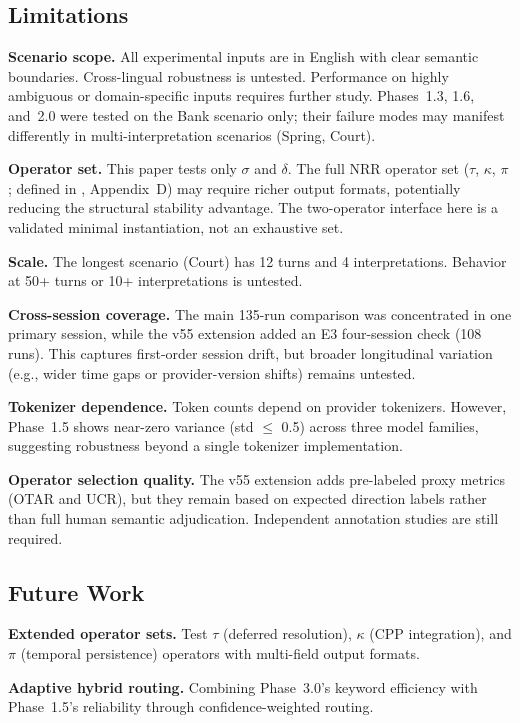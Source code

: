 \documentclass[11pt,a4paper]{article}
\begin{document}
\subsection{Limitations}

\textbf{Scenario scope.} All experimental inputs are in English with clear semantic
boundaries. Cross-lingual robustness is untested. Performance on highly
ambiguous or domain-specific inputs requires further study.
Phases~1.3, 1.6, and~2.0 were tested on the Bank scenario only; their failure
modes may manifest differently in multi-interpretation scenarios (Spring, Court).

\textbf{Operator set.} This paper tests only $\sigma$ and $\delta$. The full
NRR operator set ($\tau$, $\kappa$, $\pi$; defined in \cite{saito2026phi}, Appendix~D) may require richer output formats,
potentially reducing the structural stability advantage.
The two-operator interface here is a validated minimal instantiation, not an exhaustive set.

\textbf{Scale.} The longest scenario (Court) has 12 turns and 4 interpretations.
Behavior at 50+ turns or 10+ interpretations is untested.

\textbf{Cross-session coverage.} The main 135-run comparison was concentrated in
one primary session, while the v55 extension added an E3 four-session check
(108 runs). This captures first-order session drift, but broader longitudinal
variation (e.g., wider time gaps or provider-version shifts) remains untested.

\textbf{Tokenizer dependence.} Token counts depend on provider tokenizers.
However, Phase~1.5 shows near-zero variance (std $\leq$ 0.5) across three model
families, suggesting robustness beyond a single tokenizer implementation.

\textbf{Operator selection quality.} The v55 extension adds pre-labeled
proxy metrics (OTAR and UCR), but they remain based on expected direction
labels rather than full human semantic adjudication. Independent annotation
studies are still required.

\subsection{Future Work}

\textbf{Extended operator sets.} Test $\tau$ (deferred resolution),
$\kappa$ (CPP integration), and $\pi$ (temporal persistence) operators
\cite{saito2026phi} with multi-field output formats.

\textbf{Adaptive hybrid routing.} Combining Phase~3.0's keyword efficiency with
Phase~1.5's reliability through confidence-weighted routing.
\end{document}
